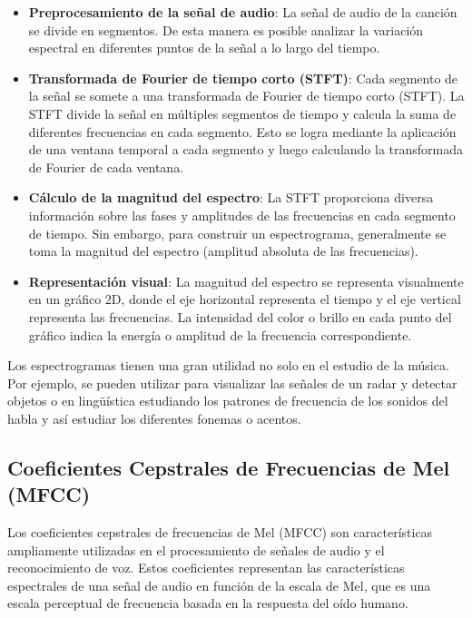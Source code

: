 \begin{itemize}
\tightlist
\item \textbf{Preprocesamiento de la señal de audio}: La señal de audio de la canción se divide en segmentos. De esta manera es posible analizar la variación espectral en diferentes puntos de la señal a lo largo del tiempo.

\item \textbf{Transformada de Fourier de tiempo corto (STFT)}: Cada segmento de la señal se somete a una transformada de Fourier de tiempo corto (STFT). La STFT divide la señal en múltiples segmentos de tiempo y calcula la suma de diferentes frecuencias en cada segmento. 
Esto se logra mediante la aplicación de una ventana temporal a cada segmento y luego calculando la transformada de Fourier de cada ventana.

\item \textbf{Cálculo de la magnitud del espectro}: La STFT proporciona diversa información sobre las fases y amplitudes de las frecuencias en cada segmento de tiempo. Sin embargo, para construir un espectrograma, generalmente se toma la magnitud del espectro (amplitud absoluta de las frecuencias).

\item \textbf{Representación visual}: La magnitud del espectro se representa visualmente en un gráfico 2D, donde el eje horizontal representa el tiempo y el eje vertical representa las frecuencias. La intensidad del color o brillo en cada punto del gráfico indica la energía o amplitud de la frecuencia correspondiente.
\end{itemize}

Los espectrogramas tienen una gran utilidad no solo en el estudio de la música. Por ejemplo, se pueden utilizar para visualizar las señales de un radar y detectar objetos o en lingüística estudiando los patrones de frecuencia de los sonidos del habla y así estudiar los diferentes fonemas o acentos.


\newpage

\subsection{Coeﬁcientes Cepstrales de Frecuencias de Mel (MFCC)}
Los coeficientes cepstrales de frecuencias de Mel (MFCC) son características ampliamente utilizadas en el procesamiento de señales de audio y el reconocimiento de voz. 
Estos coeficientes representan las características espectrales de una señal de audio en función de la escala de Mel, que es una escala perceptual de frecuencia basada en la respuesta del oído humano. \cite{SAHIDULLAH2012543} \cite{Deruty_2022}

